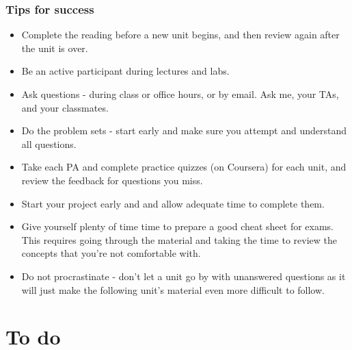 \documentclass[slidestop,compress,mathserif,12pt,t,professionalfonts,xcolor=table]{beamer}
\begin{document}
\begin{frame}
\frametitle{Tips for success}

{\footnotesize
\begin{itemize}[<alert@+>]
\item Complete the reading before a new unit begins, and then review again after the 
unit is over.
\item Be an active participant during lectures and labs.
\item Ask questions - during class or office hours, or by email. Ask me, your TAs, and 
your classmates.
\item Do the problem sets - start early and make sure you attempt and understand all 
questions.
\item Take each PA and complete practice quizzes (on Coursera) for each unit, and
review the feedback for questions you miss.
\item Start your project early and and allow adequate time to complete them.
\item Give yourself plenty of time time to prepare a good cheat sheet for exams. This 
requires going through the material and taking the time to review the concepts that 
you're not comfortable with.
\item Do not procrastinate - don't let a unit go by with unanswered questions as it 
will just make the following unit's material even more difficult to follow. 
\end{itemize}
}

\end{frame}


\section{To do}

\end{document}
